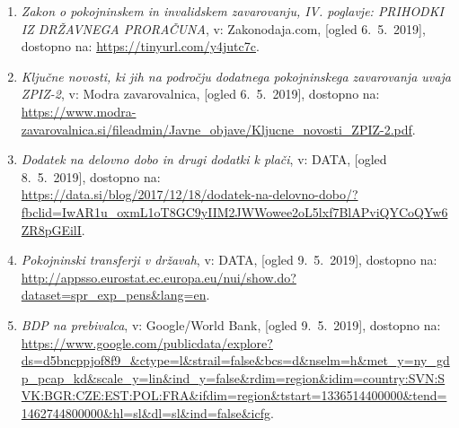 \documentclass[12pt, a4paper]{article}
\begin{document}
\begin{enumerate}
\item
\label{ZPIZ2}
\emph{Zakon o pokojninskem in invalidskem zavarovanju, IV. poglavje: PRIHODKI IZ DRŽAVNEGA PRORAČUNA}, v: Zakonodaja.com, [ogled 6.~5.~2019], dostopno na: \url{https://tinyurl.com/y4jutc7c}.

\item
\label{Novosti ZIPZ2}
\emph{Ključne novosti, ki jih na področju dodatnega pokojninskega zavarovanja uvaja ZPIZ-2}, v: Modra zavarovalnica, [ogled 6.~5.~2019], dostopno na: \url{https://www.modra-zavarovalnica.si/fileadmin/Javne_objave/Kljucne_novosti_ZPIZ-2.pdf}.

\item
\label{Dodatek na delovno dobo in drugi dodatki k plači}
\emph{Dodatek na delovno dobo in drugi dodatki k plači}, v: DATA, [ogled 8.~5.~2019], dostopno na:\\ \url{https://data.si/blog/2017/12/18/dodatek-na-delovno-dobo/?fbclid=IwAR1u_oxmL1oT8GC9yIIM2JWWowee2oL5lxf7BlAPviQYCoQYw6ZR8pGEilI}.



\item
\label{Pokojninski transferji v državah}
\emph{Pokojninski transferji v državah}, v: DATA, [ogled 9.~5.~2019], dostopno na:\\ \url{http://appsso.eurostat.ec.europa.eu/nui/show.do?dataset=spr_exp_pens&lang=en}.

\item
\label{BDP na prebivalca}
\emph{BDP na prebivalca}, v: Google/World Bank, [ogled 9.~5.~2019], dostopno na:\\ \url{https://www.google.com/publicdata/explore?ds=d5bncppjof8f9_&ctype=l&strail=false&bcs=d&nselm=h&met_y=ny_gdp_pcap_kd&scale_y=lin&ind_y=false&rdim=region&idim=country:SVN:SVK:BGR:CZE:EST:POL:FRA&ifdim=region&tstart=1336514400000&tend=1462744800000&hl=sl&dl=sl&ind=false&icfg}.
\end{enumerate}
\end{document}
